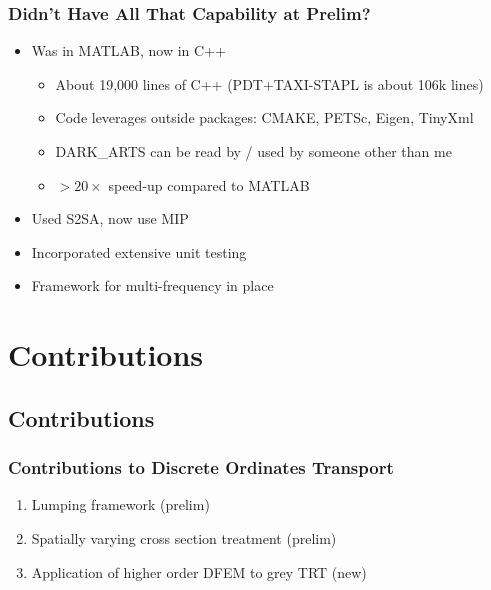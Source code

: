 \documentclass{beamer}
\begin{document}
\begin{frame}
\frametitle{Didn't Have All That Capability at Prelim?}

\begin{itemize}
\item Was in MATLAB, now in C++
\begin{itemize}
\item About 19,000 lines of C++ (PDT+TAXI-STAPL is about 106k lines)
\item Code leverages outside packages: CMAKE, PETSc, Eigen, TinyXml
\item DARK\_ARTS can be read by / used by someone other than me
\item $>20 \times$ speed-up compared to MATLAB
\end{itemize}
\item Used S2SA, now use MIP
\item Incorporated extensive unit testing
\item Framework for multi-frequency in place
\end{itemize}

\end{frame}

\section{Contributions}
\subsection{Contributions}
\begin{frame}
\frametitle{Contributions to Discrete Ordinates Transport}
\begin{enumerate}
%
\item Lumping framework (prelim)
\item Spatially varying cross section treatment (prelim)
\item Application of higher order DFEM to grey TRT (new)
\end{enumerate}

\end{frame}
%
\end{document}
